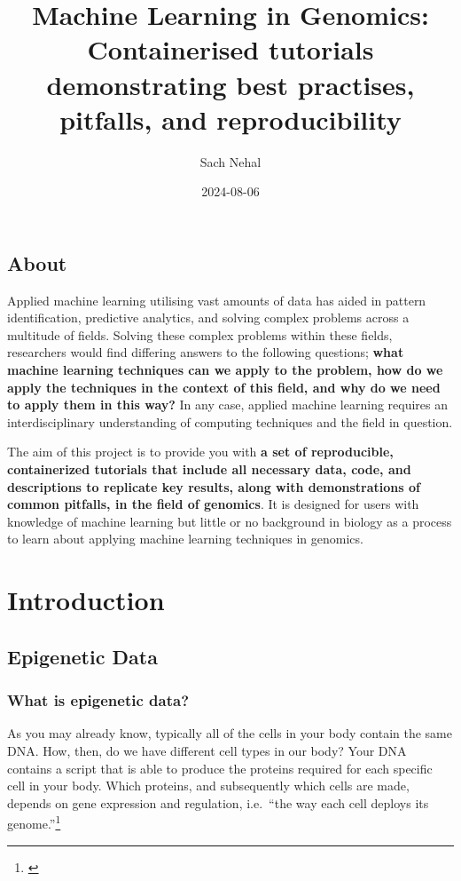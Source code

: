 \documentclass[
]{book}
\title{Machine Learning in Genomics: Containerised tutorials demonstrating best practises, pitfalls, and reproducibility}
\author{Sach Nehal}
\date{2024-08-06}
\begin{document}
\maketitle

{
\setcounter{tocdepth}{1}
\tableofcontents
}
\chapter*{About}\label{about}

Applied machine learning utilising vast amounts of data has aided in pattern identification, predictive analytics, and solving complex problems across a multitude of fields. Solving these complex problems within these fields, researchers would find differing answers to the following questions; \textbf{what machine learning techniques can we apply to the problem, how do we apply the techniques in the context of this field, and why do we need to apply them in this way?} In any case, applied machine learning requires an interdisciplinary understanding of computing techniques and the field in question.

The aim of this project is to provide you with \textbf{a set of reproducible, containerized tutorials that include all necessary data, code, and descriptions to replicate key results, along with demonstrations of common pitfalls, in the field of genomics}. It is designed for users with knowledge of machine learning but little or no background in biology as a process to learn about applying machine learning techniques in genomics.

\part{Introduction}\label{part-introduction}

\chapter{Epigenetic Data}\label{epigenetic-data}

\section{What is epigenetic data?}\label{what-is-epigenetic-data}

As you may already know, typically all of the cells in your body contain the same DNA. How, then, do we have different cell types in our body? Your DNA contains a script that is able to produce the proteins required for each specific cell in your body. Which proteins, and subsequently which cells are made, depends on gene expression and regulation, i.e.~``the way each cell deploys its genome.''\footnote{\citet{ralston2008}}
\end{document}
